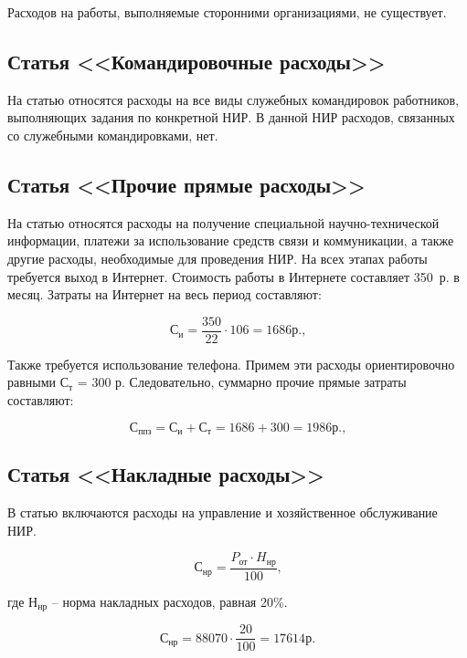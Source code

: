 Расходов на работы, выполняемые сторонними организациями, не существует.

\subsection{Статья <<Командировочные расходы>>}

На статью относятся расходы на все виды служебных командировок работников, выполняющих
задания по конкретной НИР. В данной НИР расходов, связанных со служебными командировками, нет.

\subsection{Статья <<Прочие прямые расходы>>}

На статью относятся расходы на получение специальной научно-технической информации, платежи
за использование средств связи и коммуникации, а также другие расходы, необходимые для проведения НИР.
На всех этапах работы требуется выход в Интернет. Стоимость работы в Интернете составляет 350~р. в месяц.
Затраты на Интернет на весь период составляют:

\begin{equation}
С_{и} = \frac{350}{22} \cdot 106 = 1 686 р.\mbox{,}
\label{F:F5}
\end{equation}

Также требуется использование телефона. Примем эти расходы ориентировочно равными $С_{т}$ = 300 р.
Следовательно, суммарно прочие прямые затраты составляют:

\begin{equation}
С_{ппз} = С_{и} + С_{т} = 1 686 + 300 = 1 986 р.\mbox{,}
\label{F:F6}
\end{equation}

\subsection{Статья <<Накладные расходы>>}

В статью включаются расходы на управление и хозяйственное обслуживание НИР.

\begin{equation}
С_{нр} = \frac{P_{от} \cdot H_{нр}}{100}\mbox{,}
\label{F:F5}
\end{equation}

где $Н_{нр}$ – норма накладных расходов, равная 20\%.

\begin{equation}
С_{нр} = 88 070 \cdot \frac{20}{100} = 17 614 р.
\label{F:F6}
\end{equation}

